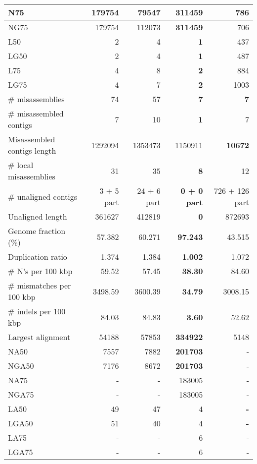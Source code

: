 \documentclass[12pt,a4paper]{article}
\begin{document}
\begin{table}[ht]
\begin{center}
\begin{tabular}{|l*{4}{|r}|}
N75 & 179754 & 79547 & {\bf 311459} & 786 \\ \hline
NG75 & 179754 & 112073 & {\bf 311459} & 706 \\ \hline
L50 & 2 & 4 & {\bf 1} & 437 \\ \hline
LG50 & 2 & 4 & {\bf 1} & 487 \\ \hline
L75 & 4 & 8 & {\bf 2} & 884 \\ \hline
LG75 & 4 & 7 & {\bf 2} & 1003 \\ \hline
\# misassemblies & 74 & 57 & {\bf 7} & {\bf 7} \\ \hline
\# misassembled contigs & 7 & 10 & {\bf 1} & 7 \\ \hline
Misassembled contigs length & 1292094 & 1353473 & 1150911 & {\bf 10672} \\ \hline
\# local misassemblies & 31 & 35 & {\bf 8} & 12 \\ \hline
\# unaligned contigs & 3 + 5 part & 24 + 6 part & {\bf 0 + 0 part} & 726 + 126 part \\ \hline
Unaligned length & 361627 & 412819 & {\bf 0} & 872693 \\ \hline
Genome fraction (\%) & 57.382 & 60.271 & {\bf 97.243} & 43.515 \\ \hline
Duplication ratio & 1.374 & 1.384 & {\bf 1.002} & 1.072 \\ \hline
\# N's per 100 kbp & 59.52 & 57.45 & {\bf 38.30} & 84.60 \\ \hline
\# mismatches per 100 kbp & 3498.59 & 3600.39 & {\bf 34.79} & 3008.15 \\ \hline
\# indels per 100 kbp & 84.03 & 84.83 & {\bf 3.60} & 52.62 \\ \hline
Largest alignment & 54188 & 57853 & {\bf 334922} & 5148 \\ \hline
NA50 & 7557 & 7882 & {\bf 201703} & - \\ \hline
NGA50 & 7176 & 8672 & {\bf 201703} & - \\ \hline
NA75 & - & - & 183005 & - \\ \hline
NGA75 & - & - & 183005 & - \\ \hline
LA50 & 49 & 47 & 4 & {\bf -} \\ \hline
LGA50 & 51 & 40 & 4 & {\bf -} \\ \hline
LA75 & - & - & 6 & - \\ \hline
LGA75 & - & - & 6 & - \\ \hline
\end{tabular}
\end{center}
\end{table}
\end{document}
